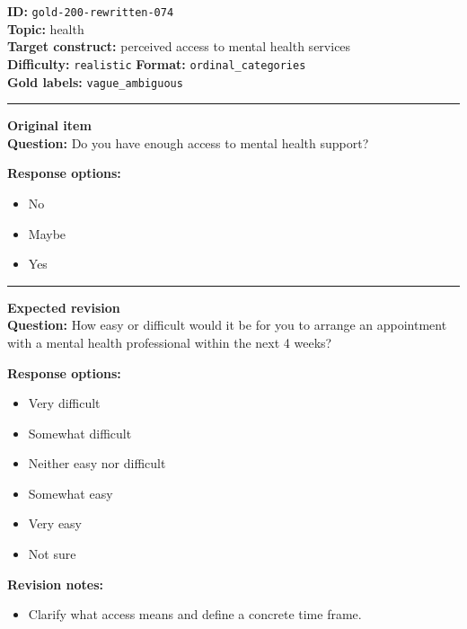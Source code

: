 \documentclass[10pt,a4paper]{article}
\newcommand{\sectionline}{\vspace{0.15em}\hrule\vspace{0.35em}}
\begin{document}
\begin{tcolorbox}[colframe=FlawRed,colback=white,colbacktitle=FlawRed!9,coltitle=black,title={Item 074\hfill Flawed item}]
\textbf{ID:} \texttt{gold-200-rewritten-074}\\
\textbf{Topic:} health\\
\textbf{Target construct:} perceived access to mental health services\\
\textbf{Difficulty:} \texttt{realistic} \quad \textbf{Format:} \texttt{ordinal\_categories}\\
\textbf{Gold labels:} \texttt{vague\_ambiguous}\\
\sectionline
\textbf{Original item}\\
\textbf{Question:} Do you have enough access to mental health support?
\par\textbf{Response options:}
\begin{itemize}
\item No
\item Maybe
\item Yes
\end{itemize}
\sectionline
\textbf{Expected revision}\\
\textbf{Question:} How easy or difficult would it be for you to arrange an appointment with a mental health professional within the next 4 weeks?
\par\textbf{Response options:}
\begin{itemize}
\item Very difficult
\item Somewhat difficult
\item Neither easy nor difficult
\item Somewhat easy
\item Very easy
\item Not sure
\end{itemize}
\par\textbf{Revision notes:}
\begin{itemize}
\item Clarify what access means and define a concrete time frame.
\end{itemize}
\end{tcolorbox}
\end{document}
